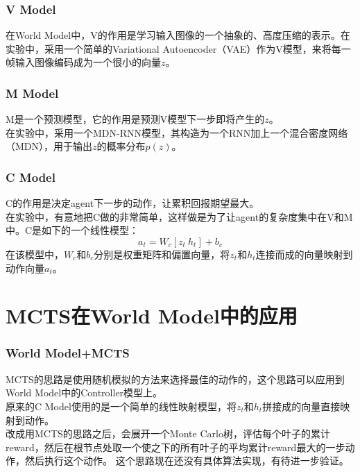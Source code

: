 \documentclass{beamer}
\begin{document}
\begin{frame}
	\frametitle{V Model}
	在World Model中，V的作用是学习输入图像的一个抽象的、高度压缩的表示。在实验中，采用一个简单的Variational Autoencoder（VAE）作为V模型，来将每一帧输入图像编码成为一个很小的向量$z$。
\end{frame}

\begin{frame}
	\frametitle{M Model}
	M是一个预测模型，它的作用是预测V模型下一步即将产生的$z$。\\
	在实验中，采用一个MDN-RNN模型，其构造为一个RNN加上一个混合密度网络（MDN），用于输出$z$的概率分布$p(z)$。
\end{frame}

\begin{frame}
	\frametitle{C Model}
	C的作用是决定agent下一步的动作，让累积回报期望最大。\\
	在实验中，有意地把C做的非常简单，这样做是为了让agent的复杂度集中在V和M中。C是如下的一个线性模型：
	\begin{equation}
		a_t=W_c[z_t\ h_t]+b_c
	\end{equation}
	在该模型中，$W_c$和$b_c$分别是权重矩阵和偏置向量，将$z_t$和$h_t$连接而成的向量映射到动作向量$a_t$。
\end{frame}

\section{MCTS在World Model中的应用}

\begin{frame}
	\frametitle{World Model+MCTS}
	MCTS的思路是使用随机模拟的方法来选择最佳的动作的，这个思路可以应用到World Model中的Controller模型上。\\
	原来的C Model使用的是一个简单的线性映射模型，将$z_t$和$h_t$拼接成的向量直接映射到动作。\\
	改成用MCTS的思路之后，会展开一个Monte Carlo树，评估每个叶子的累计reward，然后在根节点处取一个使之下的所有叶子的平均累计reward最大的一步动作，然后执行这个动作。
	这个思路现在还没有具体算法实现，有待进一步验证。
\end{frame}
\end{document}
